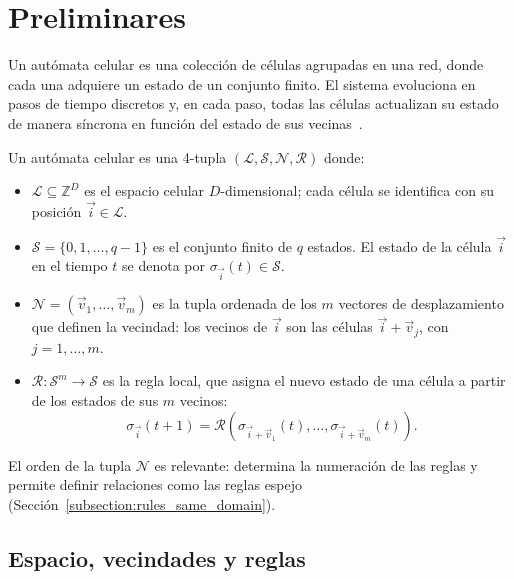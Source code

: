 \section{Preliminares}

Un autómata celular es una colección de células agrupadas en una red, donde cada una adquiere un estado de un conjunto finito. El sistema evoluciona en pasos de tiempo discretos y, en cada paso, todas las células actualizan su estado de manera síncrona en función del estado de sus vecinas~\cite{weisstein2002_ca,wolfram1982_ca,fsancho2016_ca}.

\begin{definition}
\label{def:ca}
Un autómata celular es una 4-tupla $(\mathcal{L}, \mathcal{S}, \mathcal{N}, \mathcal{R})$ donde:
\begin{itemize}
    \item $\mathcal{L} \subseteq \mathbb{Z}^D$ es el espacio celular $D$-dimensional; cada célula se identifica con su posición $\vec{i} \in \mathcal{L}$.

    \item $\mathcal{S} = \{0, 1, \dots, q-1\}$ es el conjunto finito de $q$ estados. El estado de la célula $\vec{i}$ en el tiempo $t$ se denota por $\sigma_{\vec{i}}(t) \in \mathcal{S}$.

    \item $\mathcal{N} = (\vec{v}_1, \dots, \vec{v}_m)$ es la tupla ordenada de los $m$ vectores de desplazamiento que definen la vecindad: los vecinos de $\vec{i}$ son las células $\vec{i} + \vec{v}_j$, con $j = 1, \dots, m$.

    \item $\mathcal{R} : \mathcal{S}^m \to \mathcal{S}$ es la regla local, que asigna el nuevo estado de una célula a partir de los estados de sus $m$ vecinos:
    \[
    \sigma_{\vec{i}}(t + 1) = \mathcal{R}\left( \sigma_{\vec{i} + \vec{v}_1}(t), \dots, \sigma_{\vec{i} + \vec{v}_m}(t) \right).
    \]
\end{itemize}
\end{definition}

El orden de la tupla $\mathcal{N}$ es relevante: determina la numeración de las reglas y permite definir relaciones como las reglas espejo (Sección~\ref{subsection:rules_same_domain}).

\subsection{Espacio, vecindades y reglas}

